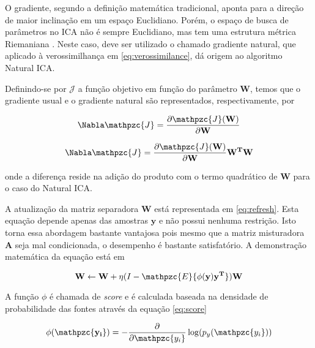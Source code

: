     O gradiente, segundo a definição matemática tradicional, aponta para a direção de maior inclinação em um espaço Euclidiano. Porém, o espaço de busca de parâmetros no ICA não é sempre Euclidiano, mas tem uma estrutura métrica Riemaniana \cite{Riemenn}. Neste caso, deve ser utilizado o chamado gradiente natural, que aplicado à verossimilhança em \ref{eq:verossimilance}, dá origem ao algoritmo Natural ICA.
    
    Definindo-se por $\mathcal{J}$ a função objetivo em função do parâmetro $\mathbf{W}$, temos que o gradiente usual e o gradiente natural são representados, respectivamente, por
    
    \begin{equation}
        \label{eq:gradiente}
        \Nabla\mathpzc{J} = \frac{\partial \mathpzc{J}(\mathbf{W})}{\partial \mathbf{W}}
    \end{equation}
    
        \begin{equation}
        \label{eq:naturalgradiente}
        \Nabla\mathpzc{J} = \frac{\partial \mathpzc{J}(\mathbf{W})}{\partial \mathbf{W}}\mathbf{W^T}\mathbf{W}
    \end{equation}
    
    onde a diferença reside na adição do produto com o termo quadrático de $\mathbf{W}$ para o caso do Natural ICA.
    
    A atualização da matriz separadora $\mathbf{W}$ está representada em \ref{eq:refresh}. Esta equação depende apenas das amostras $\mathbf{y}$ e não possui nenhuma restrição. Isto torna essa abordagem bastante vantajosa pois mesmo que a matriz misturadora $\mathbf{A}$ seja mal condicionada, o desempenho é bastante satisfatório. A demonstração matemática da equação está em \cite{ICA3}
    
    \begin{equation}
    \label{eq:refresh}
    \mathbf{W} \leftarrow \mathbf{W} + \eta(I - \mathpzc{E}\{\phi({\mathbf{y})\mathbf{y^T}}\})\mathbf{W}
    \end{equation}
    
    A função $\phi$ é chamada de \textit{score} e é calculada baseada na densidade de probabilidade das fontes através da equação \ref{eq:score}
    
        \begin{equation}
    \label{eq:score}
    \mathbf{\phi({\mathpzc{y_i}})} = - \frac{\partial}{\partial \mathpzc{y_i}} \log(p_y(\mathpzc{y_i}))
    \end{equation}
    
